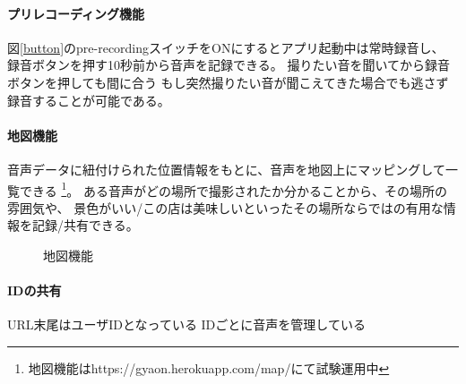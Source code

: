 \paragraph{プリレコーディング機能}
図\ref{button}のpre-recordingスイッチをONにするとアプリ起動中は常時録音し、
録音ボタンを押す10秒前から音声を記録できる。
撮りたい音を聞いてから録音ボタンを押しても間に合う
もし突然撮りたい音が聞こえてきた場合でも逃さず録音することが可能である。

\paragraph{地図機能}
音声データに紐付けられた位置情報をもとに、音声を地図上にマッピングして一覧できる
\footnote{\textsf{地図機能はhttps://gyaon.herokuapp.com/map/にて試験運用中}}。
ある音声がどの場所で撮影されたか分かることから、その場所の雰囲気や、
景色がいい/この店は美味しいといったその場所ならではの有用な情報を記録/共有できる。

\begin{figure}[H]
\centering
{}
\caption{地図機能}
\label{map}
\end{figure}

\paragraph{IDの共有}
URL末尾はユーザIDとなっている
IDごとに音声を管理している

